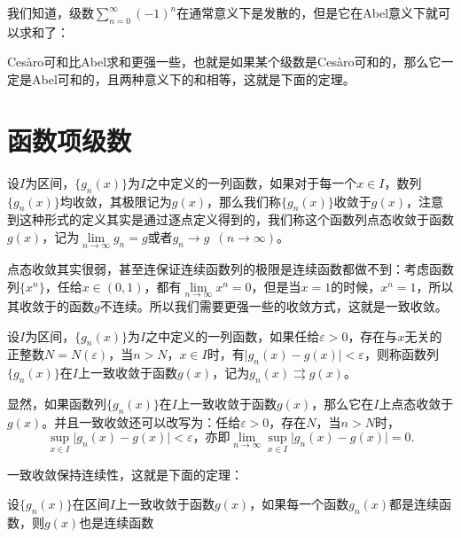     我们知道，级数\(\sum\limits_{n=0}^{\infty}(-1)^n\)在通常意义下是发散的，但是它在Abel意义下就可以求和了：
    \begin{definition}

    \end{definition}
    Ces\`{a}ro可和比Abel求和更强一些，也就是如果某个级数是Ces\`{a}ro可和的，那么它一定是Abel可和的，且两种意义下的和相等，这就是下面的定理。
    \begin{theorem}
        
    \end{theorem}
\section{函数项级数}

设\(I\)为区间，\(\{g_n(x)\}\)为\(I\)之中定义的一列函数，如果对于每一个\(x\in I\)，数列\(\{g_n(x)\}\)均收敛，其极限记为\(g(x)\)，那么我们称\(\{g_n(x)\}\)收敛于\(g(x)\)，注意到这种形式的定义其实是通过{\heiti 逐点定义}得到的，我们称这个函数列{\heiti 点态收敛}于函数\(g(x)\)，记为\(\lim\limits_{n\to \infty}g_n=g\)或者\(g_n\to g\enspace(n\to\infty)\)。

点态收敛其实很弱，甚至连保证连续函数列的极限是连续函数都做不到：考虑函数列\(\{x^n\}\)，任给\(x\in(0,1)\)，都有\(\lim\limits_{n\to \infty}x^n = 0\)，但是当\(x=1\)的时候，\(x^n=1\)，所以其收敛于的函数\(g\)不连续。所以我们需要更强一些的收敛方式，这就是{\heiti 一致收敛}。

\begin{definition}[一致收敛]
    设\(I\)为区间，\(\{g_n(x)\}\)为\(I\)之中定义的一列函数，如果任给\(\varepsilon>0\)，存在与\(x\)无关的正整数\(N = N(\varepsilon)\)，当\(n>N\)，\(x\in I\)时，有\(\vert g_n(x)-g(x)\vert<\varepsilon\)，则称函数列\(\{g_n(x)\}\)在\(I\)上{\heiti 一致收敛}于函数\(g(x)\)，记为\(g_n(x)\rightrightarrows g(x)\)。
\end{definition}

显然，如果函数列\(\{g_n(x)\}\)在\(I\)上一致收敛于函数\(g(x)\)，那么它在\(I\)上点态收敛于\(g(x)\)。并且一致收敛还可以改写为：任给\(\varepsilon >0\)，存在\(N\)，当\(n>N\)时，\[\sup_{x\in I}\vert g_n(x)-g(x)\vert<\varepsilon\text{，亦即}\lim_{n\to\infty}\sup_{x\in I}\vert g_{n}(x)-g(x)\vert = 0.\]

一致收敛保持连续性，这就是下面的定理：
\begin{theorem}
    设\(\{g_n(x)\}\)在区间\(I\)上一致收敛于函数\(g(x)\)，如果每一个函数\(g_{n}(x)\)都是连续函数，则\(g(x)\)也是连续函数
\end{theorem}

